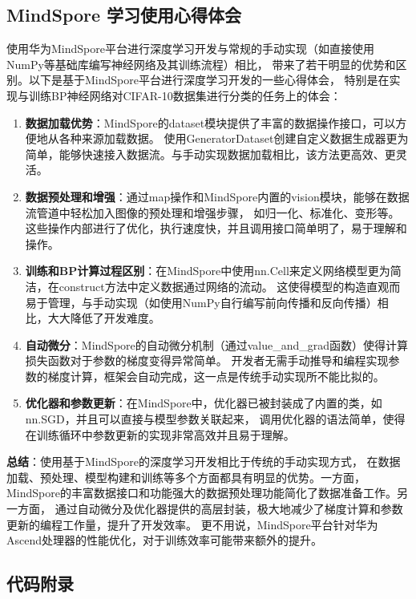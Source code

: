 \documentclass[12pt]{article}
\begin{document}
\subsection{MindSpore 学习使用心得体会}
使用华为MindSpore平台进行深度学习开发与常规的手动实现（如直接使用NumPy等基础库编写神经网络及其训练流程）相比，
带来了若干明显的优势和区别。以下是基于MindSpore平台进行深度学习开发的一些心得体会，
特别是在实现与训练BP神经网络对CIFAR-10数据集进行分类的任务上的体会：
\begin{enumerate}
  \item \textbf{数据加载优势}：MindSpore的dataset模块提供了丰富的数据操作接口，可以方便地从各种来源加载数据。
        使用GeneratorDataset创建自定义数据生成器更为简单，能够快速接入数据流。与手动实现数据加载相比，该方法更高效、更灵活。
  \item \textbf{数据预处理和增强}：通过map操作和MindSpore内置的vision模块，能够在数据流管道中轻松加入图像的预处理和增强步骤，
        如归一化、标准化、变形等。这些操作内部进行了优化，执行速度快，并且调用接口简单明了，易于理解和操作。
  \item \textbf{训练和BP计算过程区别}：在MindSpore中使用nn.Cell来定义网络模型更为简洁，在construct方法中定义数据通过网络的流动。
        这使得模型的构造直观而易于管理，与手动实现（如使用NumPy自行编写前向传播和反向传播）相比，大大降低了开发难度。
  \item \textbf{自动微分}：MindSpore的自动微分机制（通过value\_and\_grad函数）使得计算损失函数对于参数的梯度变得异常简单。
        开发者无需手动推导和编程实现参数的梯度计算，框架会自动完成，这一点是传统手动实现所不能比拟的。
  \item \textbf{优化器和参数更新}：在MindSpore中，优化器已被封装成了内置的类，如nn.SGD，并且可以直接与模型参数关联起来，
        调用优化器的语法简单，使得在训练循环中参数更新的实现非常高效并且易于理解。

\end{enumerate}

\textbf{总结}：使用基于MindSpore的深度学习开发相比于传统的手动实现方式，
在数据加载、预处理、模型构建和训练等多个方面都具有明显的优势。一方面，
MindSpore的丰富数据接口和功能强大的数据预处理功能简化了数据准备工作。另一方面，
通过自动微分及优化器提供的高层封装，极大地减少了梯度计算和参数更新的编程工作量，提升了开发效率。
更不用说，MindSpore平台针对华为Ascend处理器的性能优化，对于训练效率可能带来额外的提升。



\subsection{代码附录}
\end{document}
